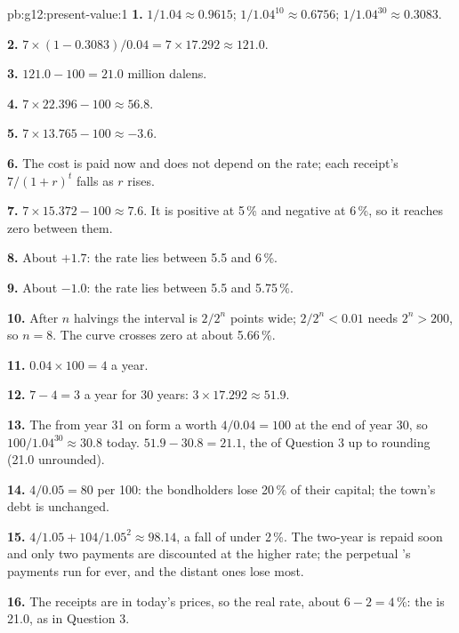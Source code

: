 \begin{solution}{pb:g12:present-value:1}
\textbf{1.} $1/1.04 \approx 0.9615$; $1/1.04^{10} \approx 0.6756$; $1/1.04^{30} \approx 0.3083$.

\textbf{2.} $7 \times (1 - 0.3083)/0.04 = 7 \times 17.292 \approx 121.0$.

\textbf{3.} $121.0 - 100 = 21.0$ million dalens.

\textbf{4.} $7 \times 22.396 - 100 \approx 56.8$.

\textbf{5.} $7 \times 13.765 - 100 \approx -3.6$.

\textbf{6.} The cost is paid now and does not depend on the rate; each receipt's  $7/(1 + r)^t$ falls as $r$ rises.

\textbf{7.} $7 \times 15.372 - 100 \approx 7.6$. It is positive at 5\,\% and negative at 6\,\%, so it reaches zero between them.

\textbf{8.} About $+1.7$: the rate lies between 5.5 and 6\,\%.

\textbf{9.} About $-1.0$: the rate lies between 5.5 and 5.75\,\%.

\textbf{10.} After $n$ halvings the interval is $2/2^n$ points wide; $2/2^n < 0.01$ needs $2^n > 200$, so $n = 8$. The curve crosses zero at about 5.66\,\%.

\textbf{11.} $0.04 \times 100 = 4$ a year.

\textbf{12.} $7 - 4 = 3$ a year for 30 years: $3 \times 17.292 \approx 51.9$.

\textbf{13.} The  from year 31 on form a  worth $4/0.04 = 100$ at the end of year 30, so $100/1.04^{30} \approx 30.8$ today. $51.9 - 30.8 = 21.1$, the  of Question 3 up to rounding (21.0 unrounded).

\textbf{14.} $4/0.05 = 80$ per 100: the bondholders lose 20\,\% of their capital; the town's debt is unchanged.

\textbf{15.} $4/1.05 + 104/1.05^2 \approx 98.14$, a fall of under 2\,\%. The two-year  is repaid soon and only two payments are discounted at the higher rate; the
perpetual 's payments run for ever, and the distant ones lose most.

\textbf{16.} The receipts are in today's prices, so the real rate, about $6 - 2 = 4\,\%$: the  is 21.0, as in Question 3.


\end{solution}
